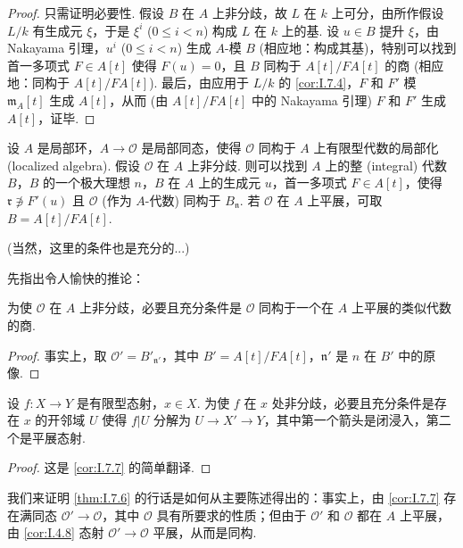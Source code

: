 \begin{proof}
只需证明必要性. 假设 $B$ 在 $A$ 上非分歧，故 $L$ 在 $k$ 上可分，由所作假设 $L/k$ 有生成元 $\xi$，于是 $\xi^i$ ($0 \leqslant i < n$) 构成 $L$ 在 $k$ 上的基. 设 $u \in B$ 提升 $\xi$，由 Nakayama 引理，$u^i$ ($0 \leqslant i < n$) 生成 $A$-模 $B$ (相应地：构成其基)，特别可以找到首一多项式 $F \in A[t]$ 使得 $F(u) = 0$，且 $B$ 同构于 $A[t]/FA[t]$ 的商 (相应地：同构于 $A[t]/FA[t]$). 最后，由应用于 $L/k$ 的 \ref{cor:I.7.4}，$F$ 和 $F'$ 模 $\mathfrak{m}_A[t]$ 生成 $A[t]$，从而 (由 $A[t]/FA[t]$ 中的 Nakayama 引理) $F$ 和 $F'$ 生成 $A[t]$，证毕.
\end{proof}

\begin{theorem}\label{thm:I.7.6}
设 $A$ 是局部环，$A \to \mathcal{O}$ 是局部同态，使得 $\mathcal{O}$ 同构于 $A$ 上有限型代数的局部化 (localized algebra). 假设 $\mathcal{O}$ 在 $A$ 上非分歧. 则可以找到 $A$ 上的整 (integral) 代数 $B$，$B$ 的一个极大理想 $n$，$B$ 在 $A$ 上的生成元 $u$，首一多项式 $F \in A[t]$，使得 $\mathfrak{r} \not\ni F'(u)$ 且 $\mathcal{O}$ (作为 $A$-代数) 同构于 $B_{\mathfrak{n}}$. 若 $\mathcal{O}$ 在 $A$ 上平展，可取 $B = A[t]/FA[t]$.
\end{theorem}

(当然，这里的条件也是充分的...)

先指出令人愉快的推论：

\begin{corollary}\label{cor:I.7.7}
为使 $\mathcal{O}$ 在 $A$ 上非分歧，必要且充分条件是 $\mathcal{O}$ 同构于一个在 $A$ 上平展的类似代数的商.
\end{corollary}

\begin{proof}
事实上，取 $\mathcal{O}' = B'_{\mathfrak{n}'}$，其中 $B' = A[t]/FA[t]$，$\mathfrak{n}'$ 是 $n$ 在 $B'$ 中的原像.
\end{proof}

\begin{corollary}\label{cor:I.7.8}
设 $f \colon X \to Y$ 是有限型态射，$x \in X$. 为使 $f$ 在 $x$ 处非分歧，必要且充分条件是存在 $x$ 的开邻域 $U$ 使得 $f|U$ 分解为 $U \to X' \to Y$，其中第一个箭头是闭浸入，第二个是平展态射.
\end{corollary}

\begin{proof}
这是 \ref{cor:I.7.7} 的简单翻译.
\end{proof}

我们来证明 \ref{thm:I.7.6} 的行话是如何从主要陈述得出的：事实上，由 \ref{cor:I.7.7} 存在满同态 $\mathcal{O}' \to \mathcal{O}$，其中 $\mathcal{O}$ 具有所要求的性质；但由于 $\mathcal{O}'$ 和 $\mathcal{O}$ 都在 $A$ 上平展，由 \ref{cor:I.4.8} 态射 $\mathcal{O}' \to \mathcal{O}$ 平展，从而是同构.

